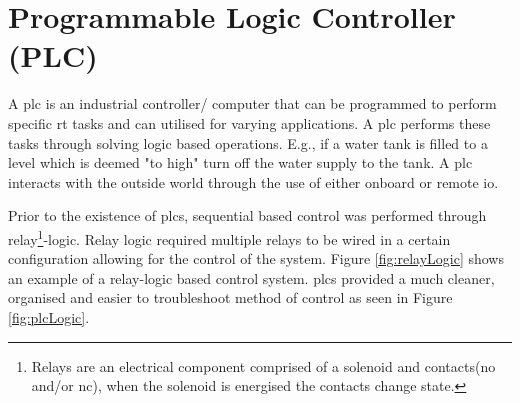 \section{Programmable Logic Controller (PLC)}


    A \acrfull{plc} is an industrial controller/ computer that can be programmed to perform specific \acrshort{rt} tasks and can utilised for varying applications\cite{petruzella2017programmable}. A \acrshort{plc} performs these tasks through solving logic based operations\cite{petruzella2017programmable}.  E.g., if a water tank is filled to a level which is deemed "to high" turn off the water supply to the tank. A \acrshort{plc} interacts with the outside world through the use of either onboard or remote \acrshort{io}.
    
    Prior to the existence of \acrshort{plc}s, sequential based control was performed through relay\footnote{Relays are an electrical component comprised of a solenoid and contacts(\acrshort{no} and/or \acrshort{nc}), when the solenoid is energised the contacts change state.}-logic. Relay logic required multiple relays to be wired in a certain configuration allowing for the control of the system. Figure \ref{fig:relayLogic} shows an example of a relay-logic based control system\cite{petruzella2017programmable}. 
    \acrshort{plc}s provided a much cleaner, organised and easier to troubleshoot method of control as seen in Figure \ref{fig:plcLogic}.    
    
